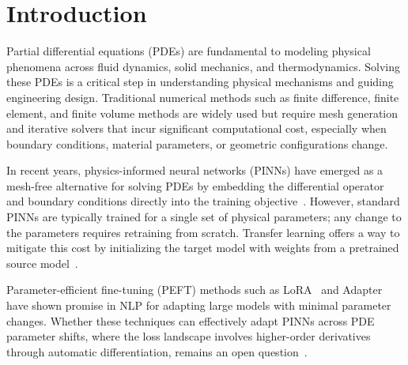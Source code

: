 \section{Introduction}
\label{sec:intro}

Partial differential equations (PDEs)
are fundamental to modeling physical phenomena across fluid dynamics,
solid mechanics, and thermodynamics.
Solving these PDEs is a critical step in understanding physical mechanisms and
guiding engineering design.
Traditional numerical methods such as finite difference, finite element,
and finite volume methods are widely used but require mesh generation and
iterative solvers that incur significant computational cost,
especially when boundary conditions, material parameters,
or geometric configurations change.

In recent years, physics-informed neural networks (PINNs)
have emerged as a mesh-free alternative for solving PDEs by embedding the
differential operator and boundary conditions directly into the training
objective~\cite{raissi2019pinn}.
However, standard PINNs are typically trained for a single set of physical
parameters; any change to the parameters requires retraining from scratch.
Transfer learning offers a way to mitigate this cost by initializing the target
model with weights from a pretrained source model~\cite{wang2023expert}.

Parameter-efficient fine-tuning (PEFT)
methods such as LoRA~\cite{hu2022lora} and Adapter~\cite{houlsby2019adapter}
have shown promise in NLP for adapting large models with minimal parameter
changes.
Whether these techniques can effectively adapt PINNs across PDE parameter
shifts, where the loss landscape involves higher-order derivatives through
automatic differentiation, remains an open question~\cite{biderman2024lora}.
